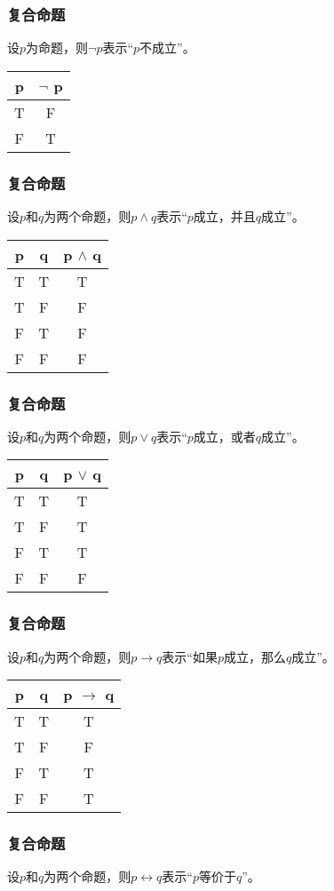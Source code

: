 \documentclass{beamer}
\begin{document}
\begin{CJK*}{UTF8}{gbsn}
\begin{frame}
\end{frame}
\begin{frame}
  \frametitle{复合命题}
  设$p$为命题，则$\lnot p$表示“$p$不成立”。

 \begin{tabular}{c|c}
    p& $\lnot$ p\\
    \hline
    T&F\\
    F&T\\
  \end{tabular}

\end{frame}
\begin{frame}
    \frametitle{复合命题}
    设$p$和$q$为两个命题，则$p\land q$表示“$p$成立，并且$q$成立”。
  
  \begin{tabular}{cc|c}
    p& q& p $\land$ q\\
    \hline
    T&T&T\\
    T&F&F\\
    F&T&F\\
    F&F&F\\
  \end{tabular}

\end{frame}
\begin{frame}
    \frametitle{复合命题}

    设$p$和$q$为两个命题，则$p\lor q$表示“$p$成立，或者$q$成立”。
  
  \begin{tabular}{cc|c}
    p& q& p $\lor$ q\\
    \hline
    T&T&T\\
    T&F&T\\
    F&T&T\\
    F&F&F\\
  \end{tabular}

\end{frame}
\begin{frame}
    \frametitle{复合命题}
  设$p$和$q$为两个命题，则$p\to q$表示“如果$p$成立，那么$q$成立”。  

    \begin{tabular}{cc|c}
    p& q& p $\to$ q\\
    \hline
    T&T&T\\
    T&F&F\\
    F&T&T\\
    F&F&T\\
    \end{tabular}
  \end{frame}
  \begin{frame}
      \frametitle{复合命题}
    设$p$和$q$为两个命题，则$p\leftrightarrow q$表示“$p$等价于$q$”。  


\end{frame}
\end{CJK*}
\end{document}
